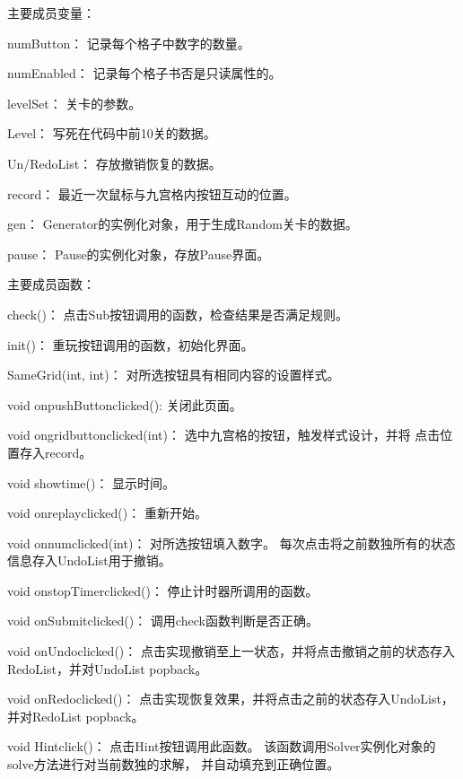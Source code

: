\documentclass[hyperref,UTF8]{ctexart}
\begin{document}
    主要成员变量：

    numButton：                        记录每个格子中数字的数量。

    numEnabled：                       记录每个格子书否是只读属性的。

    levelSet：                         关卡的参数。

    Level：                            写死在代码中前10关的数据。

    Un/RedoList：                      存放撤销恢复的数据。

    record：                           最近一次鼠标与九宫格内按钮互动的位置。

    gen：                              Generator的实例化对象，用于生成Random关卡的数据。

    pause：                            Pause的实例化对象，存放Pause界面。

    主要成员函数：

    check()：                          点击Sub按钮调用的函数，检查结果是否满足规则。

    init()：                           重玩按钮调用的函数，初始化界面。

    SameGrid(int, int)：               对所选按钮具有相同内容的设置样式。

    void onpushButtonclicked():        关闭此页面。

    void ongridbuttonclicked(int)：    选中九宫格的按钮，触发样式设计，并将
    点击位置存入record。

    void showtime()：                  显示时间。

    void onreplayclicked()：           重新开始。

    void onnumclicked(int)：           对所选按钮填入数字。
    每次点击将之前数独所有的状态信息存入UndoList用于撤销。

    void onstopTimerclicked()：        停止计时器所调用的函数。

    void onSubmitclicked()：           调用check函数判断是否正确。

    void onUndoclicked()：             点击实现撤销至上一状态，并将点击撤销之前的状态存入
    RedoList，并对UndoList popback。

    void onRedoclicked()：             点击实现恢复效果，并将点击之前的状态存入UndoList，
    并对RedoList popback。

    void Hintclick()：                 点击Hint按钮调用此函数。
    该函数调用Solver实例化对象的solve方法进行对当前数独的求解，
    并自动填充到正确位置。
\end{document}
